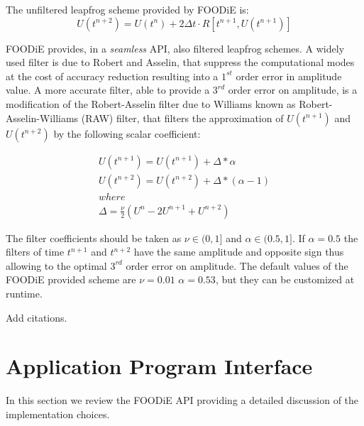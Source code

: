 \documentclass[pdftex,preprint,3p,times,numbers]{elsarticle}
\begin{document}
The unfiltered leapfrog scheme provided by FOODiE is:
\begin{equation}
  U\left(t^{n+2}\right) = U\left(t^{n}\right) + 2\Delta t \cdot R\left[t^{n+1}, U\left(t^{n+1}\right)\right]
\label{eq:leapfrog}
\end{equation}

FOODiE provides, in a \emph{seamless} API, also filtered leapfrog schemes. A widely used filter is due to Robert and Asselin, that suppress the computational modes at the cost of accuracy reduction resulting into a $1^{st}$ order error in amplitude value. A more accurate filter, able to provide a $3^{rd}$ order error on amplitude, is a modification of the Robert-Asselin filter due to Williams known as Robert-Asselin-Williams (RAW) filter, that filters the approximation of $U\left(t^{n+1}\right)$ and $U\left(t^{n+2}\right)$ by the following scalar coefficient:

\begin{equation}
  \begin{matrix}
    U\left(t^{n+1}\right) = U\left(t^{n+1}\right) + \Delta * \alpha     \\
    U\left(t^{n+2}\right) = U\left(t^{n+2}\right) + \Delta * (\alpha-1) \\
    where \\
    \Delta = \frac{\nu}{2}(U^{n} - 2 U^{n+1} + U^{n+2})
  \end{matrix}
\label{eq:leapfrog-RAW}
\end{equation}

The filter coefficients should be taken as $\nu \in (0,1]$ and $\alpha \in (0.5,1]$. If $\alpha=0.5$ the filters of time $t^{n+1}$ and $t^{n+2}$ have the same amplitude and opposite sign thus allowing to the optimal $3^{rd}$ order error on amplitude. The default values of the FOODiE provided scheme are $\nu=0.01$ $\alpha=0.53$, but they can be customized at runtime.

{\color{red} Add citations.}

\clearpage

\section{Application Program Interface}\label{sec:API}

In this section we review the FOODiE API providing a detailed discussion of the implementation choices.
\end{document}
